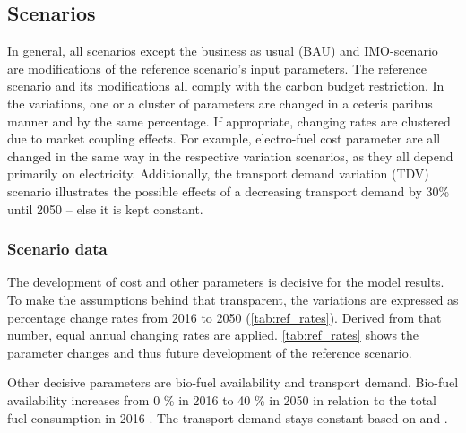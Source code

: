 \documentclass[article]{elsarticle}
\begin{document}
\subsection{Scenarios}
\label{subsec:Sce}
In general, all scenarios except the business as usual (BAU) and IMO-scenario are modifications of the reference scenario's input parameters. The reference scenario and its modifications all comply with the carbon budget restriction. In the variations, one or a cluster of parameters are changed in a ceteris paribus manner and by the same percentage. If appropriate, changing rates are clustered due to market coupling effects. For example, electro-fuel cost parameter are all changed in the same way in the respective variation scenarios, as they all depend primarily on electricity. Additionally, the transport demand variation (TDV) scenario illustrates the possible effects of a decreasing transport demand by 30\% until 2050 -- else it is kept constant.

\subsubsection{Scenario data}
The development of cost and other parameters is decisive for the model results. To make the assumptions behind that transparent, the variations are expressed as percentage change rates from 2016 to 2050 (\autoref{tab:ref_rates}). Derived from that number, equal annual changing rates are applied. \autoref{tab:ref_rates} shows the parameter changes and thus future development of the reference scenario.

Other decisive parameters are bio-fuel availability and transport demand. Bio-fuel availability increases from 0 \% in 2016 to 40 \% in 2050 in relation to the total fuel consumption in 2016 \cite{DEA2016}. The transport demand stays constant based on \cite[p.~18]{ITF2018} and \cite[p.~19]{Rex2017}.
\end{document}
